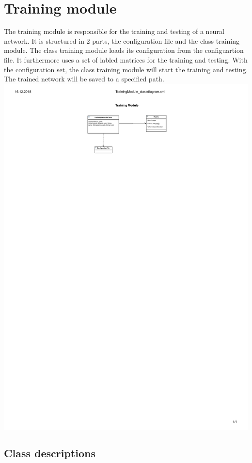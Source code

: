 \documentclass[parskip=full]{scrartcl}
\begin{document}
\section{Training module}
The training module is responsible for the training and testing of a neural network. It is structured in 2 parts, the configuration file and the class training module. The class training module loads its configuration from the configuartion file. It furthermore uses a set of labled matrices for the training and testing. With the configuration set, the class training module will start the training and testing. The trained network will be saved to a specified path.
%
\includegraphics{ClassDiagrams/PDF/TrainingModule_classdiagram.pdf}
\subsection{Class descriptions}
\end{document}
